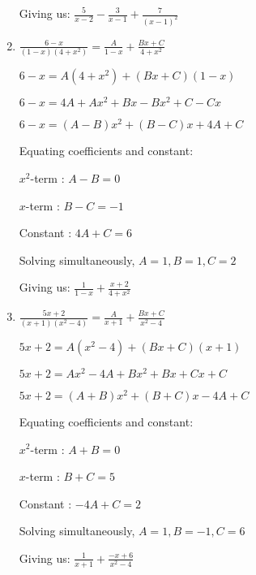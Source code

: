 \documentclass[../main.tex]{subfiles}
\begin{document}
\begin{enumerate}[itemsep=0.7cm]
    Giving us: $\frac{5}{x-2}-\frac{3}{x-1}+\frac{7}{(x-1)^2}$

    \item 
    $\frac{6-x}{(1-x)(4+x^2)}=\frac{A}{1-x}+\frac{Bx+C}{4+x^2}$

    $6-x=A(4+x^2)+(Bx+C)(1-x)$

    $6-x=4A+Ax^2+Bx-Bx^2+C-Cx$

    $6-x=(A-B)x^2+(B-C)x+4A+C$

    Equating coefficients and constant:

    $x^2$-term : $A-B=0$

    $x$-term : $B-C=-1$

    Constant : $4A+C=6$

    Solving simultaneously, $A=1, B=1, C=2$

    Giving us: $\frac{1}{1-x}+\frac{x+2}{4+x^2}$

    \item 
    $\frac{5x+2}{(x+1)(x^2-4)}=\frac{A}{x+1}+\frac{Bx+C}{x^2-4}$

    $5x+2=A(x^2-4)+(Bx+C)(x+1)$

    $5x+2=Ax^2-4A+Bx^2+Bx+Cx+C$

    $5x+2=(A+B)x^2+(B+C)x-4A+C$

    Equating coefficients and constant:

    $x^2$-term : $A+B=0$

    $x$-term : $B+C=5$

    Constant : $-4A+C=2$

    Solving simultaneously, $A=1, B=-1, C=6$

    Giving us: $\frac{1}{x+1}+\frac{-x+6}{x^2-4}$

\end{enumerate}
\end{document}

